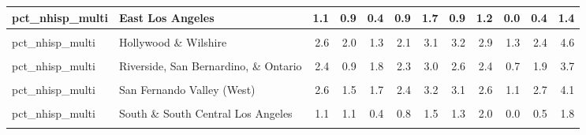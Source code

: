 \begin{table}[!h]
\begin{tabular}[t]{l|>{}l||r|r|r|r|r|r|r|r|r|r}
\hline
pct\_nhisp\_multi & East Los Angeles & 1.1 & 0.9 & 0.4 & 0.9 & 1.7 & 0.9 & 1.2 & 0.0 & 0.4 & 1.4\\
\hline
\cellcolor{gray!6}{pct\_nhisp\_multi} & \cellcolor{gray!6}{Glendale and Pasadena} & \cellcolor{gray!6}{3.5} & \cellcolor{gray!6}{2.8} & \cellcolor{gray!6}{1.9} & \cellcolor{gray!6}{2.8} & \cellcolor{gray!6}{3.7} & \cellcolor{gray!6}{3.0} & \cellcolor{gray!6}{2.7} & \cellcolor{gray!6}{1.0} & \cellcolor{gray!6}{2.4} & \cellcolor{gray!6}{4.2}\\
\hline
pct\_nhisp\_multi & Hollywood \& Wilshire & 2.6 & 2.0 & 1.3 & 2.1 & 3.1 & 3.2 & 2.9 & 1.3 & 2.4 & 4.6\\
\hline
\cellcolor{gray!6}{pct\_nhisp\_multi} & \cellcolor{gray!6}{Long Beach} & \cellcolor{gray!6}{2.6} & \cellcolor{gray!6}{1.0} & \cellcolor{gray!6}{2.0} & \cellcolor{gray!6}{2.7} & \cellcolor{gray!6}{3.3} & \cellcolor{gray!6}{2.9} & \cellcolor{gray!6}{2.3} & \cellcolor{gray!6}{1.2} & \cellcolor{gray!6}{2.5} & \cellcolor{gray!6}{4.2}\\
\hline
pct\_nhisp\_multi & Riverside, San Bernardino, \& Ontario & 2.4 & 0.9 & 1.8 & 2.3 & 3.0 & 2.6 & 2.4 & 0.7 & 1.9 & 3.7\\
\hline
\cellcolor{gray!6}{pct\_nhisp\_multi} & \cellcolor{gray!6}{San Fernando Valley (East)} & \cellcolor{gray!6}{3.0} & \cellcolor{gray!6}{1.4} & \cellcolor{gray!6}{2.1} & \cellcolor{gray!6}{2.9} & \cellcolor{gray!6}{3.7} & \cellcolor{gray!6}{3.1} & \cellcolor{gray!6}{2.9} & \cellcolor{gray!6}{1.0} & \cellcolor{gray!6}{2.7} & \cellcolor{gray!6}{4.4}\\
\hline
pct\_nhisp\_multi & San Fernando Valley (West) & 2.6 & 1.5 & 1.7 & 2.4 & 3.2 & 3.1 & 2.6 & 1.1 & 2.7 & 4.1\\
\hline
\cellcolor{gray!6}{pct\_nhisp\_multi} & \cellcolor{gray!6}{Santa Ana} & \cellcolor{gray!6}{2.2} & \cellcolor{gray!6}{1.2} & \cellcolor{gray!6}{1.4} & \cellcolor{gray!6}{2.1} & \cellcolor{gray!6}{2.9} & \cellcolor{gray!6}{3.2} & \cellcolor{gray!6}{2.9} & \cellcolor{gray!6}{1.1} & \cellcolor{gray!6}{2.6} & \cellcolor{gray!6}{4.9}\\
\hline
pct\_nhisp\_multi & South \& South Central Los Angeles & 1.1 & 1.1 & 0.4 & 0.8 & 1.5 & 1.3 & 2.0 & 0.0 & 0.5 & 1.8\\
\hline
\cellcolor{gray!6}{pct\_nhisp\_multi} & \cellcolor{gray!6}{South Bay} & \cellcolor{gray!6}{2.7} & \cellcolor{gray!6}{1.0} & \cellcolor{gray!6}{2.1} & \cellcolor{gray!6}{2.8} & \cellcolor{gray!6}{3.5} & \cellcolor{gray!6}{3.8} & \cellcolor{gray!6}{2.9} & \cellcolor{gray!6}{1.5} & \cellcolor{gray!6}{3.2} & \cellcolor{gray!6}{5.6}\\

\end{tabular}
\end{table}
